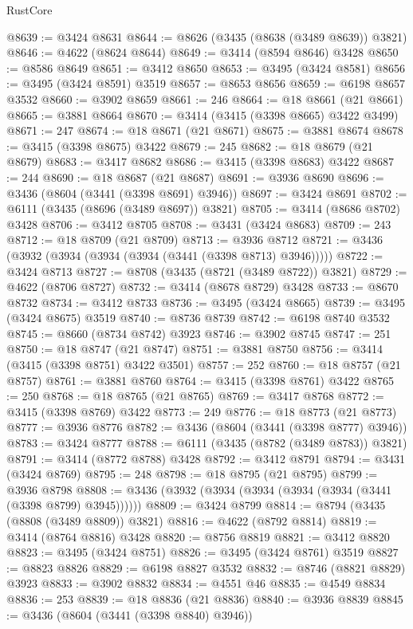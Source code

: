 \begin{lexlean}{RustCore}
\begin{coremodule}
@8639 := @3424 @8631
@8644 := @8626 (@3435 (@8638 (@3489 @8639)) @3821)
@8646 := @4622 (@8624 @8644)
@8649 := @3414 (@8594 @8646) @3428
@8650 := @8586 @8649
@8651 := @3412 @8650
@8653 := @3495 (@3424 @8581)
@8656 := @3495 (@3424 @8591) @3519
@8657 := @8653 @8656
@8659 := @6198 @8657 @3532
@8660 := @3902 @8659
@8661 := 246
@8664 := @18 @8661 (@21 @8661)
@8665 := @3881 @8664
@8670 := @3414 (@3415 (@3398 @8665) @3422 @3499)
@8671 := 247
@8674 := @18 @8671 (@21 @8671)
@8675 := @3881 @8674
@8678 := @3415 (@3398 @8675) @3422
@8679 := 245
@8682 := @18 @8679 (@21 @8679)
@8683 := @3417 @8682
@8686 := @3415 (@3398 @8683) @3422
@8687 := 244
@8690 := @18 @8687 (@21 @8687)
@8691 := @3936 @8690
@8696 := @3436 (@8604 (@3441 (@3398 @8691) @3946))
@8697 := @3424 @8691
@8702 := @6111 (@3435 (@8696 (@3489 @8697)) @3821)
@8705 := @3414 (@8686 @8702) @3428
@8706 := @3412 @8705
@8708 := @3431 (@3424 @8683)
@8709 := 243
@8712 := @18 @8709 (@21 @8709)
@8713 := @3936 @8712
@8721 := @3436 (@3932 (@3934 (@3934 (@3934 (@3441 (@3398 @8713) @3946)))))
@8722 := @3424 @8713
@8727 := @8708 (@3435 (@8721 (@3489 @8722)) @3821)
@8729 := @4622 (@8706 @8727)
@8732 := @3414 (@8678 @8729) @3428
@8733 := @8670 @8732
@8734 := @3412 @8733
@8736 := @3495 (@3424 @8665)
@8739 := @3495 (@3424 @8675) @3519
@8740 := @8736 @8739
@8742 := @6198 @8740 @3532
@8745 := @8660 (@8734 @8742) @3923
@8746 := @3902 @8745
@8747 := 251
@8750 := @18 @8747 (@21 @8747)
@8751 := @3881 @8750
@8756 := @3414 (@3415 (@3398 @8751) @3422 @3501)
@8757 := 252
@8760 := @18 @8757 (@21 @8757)
@8761 := @3881 @8760
@8764 := @3415 (@3398 @8761) @3422
@8765 := 250
@8768 := @18 @8765 (@21 @8765)
@8769 := @3417 @8768
@8772 := @3415 (@3398 @8769) @3422
@8773 := 249
@8776 := @18 @8773 (@21 @8773)
@8777 := @3936 @8776
@8782 := @3436 (@8604 (@3441 (@3398 @8777) @3946))
@8783 := @3424 @8777
@8788 := @6111 (@3435 (@8782 (@3489 @8783)) @3821)
@8791 := @3414 (@8772 @8788) @3428
@8792 := @3412 @8791
@8794 := @3431 (@3424 @8769)
@8795 := 248
@8798 := @18 @8795 (@21 @8795)
@8799 := @3936 @8798
@8808 := @3436 (@3932 (@3934 (@3934 (@3934 (@3934 (@3441 (@3398 @8799) @3945))))))
@8809 := @3424 @8799
@8814 := @8794 (@3435 (@8808 (@3489 @8809)) @3821)
@8816 := @4622 (@8792 @8814)
@8819 := @3414 (@8764 @8816) @3428
@8820 := @8756 @8819
@8821 := @3412 @8820
@8823 := @3495 (@3424 @8751)
@8826 := @3495 (@3424 @8761) @3519
@8827 := @8823 @8826
@8829 := @6198 @8827 @3532
@8832 := @8746 (@8821 @8829) @3923
@8833 := @3902 @8832
@8834 := @4551 @46
@8835 := @4549 @8834
@8836 := 253
@8839 := @18 @8836 (@21 @8836)
@8840 := @3936 @8839
@8845 := @3436 (@8604 (@3441 (@3398 @8840) @3946))

\end{coremodule}
\end{lexlean}
